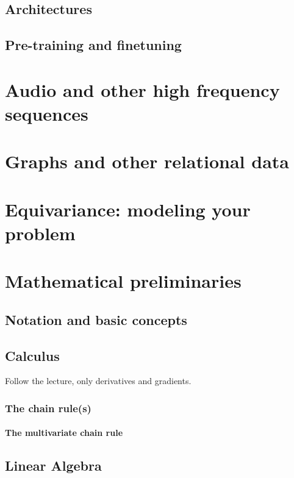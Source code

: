 \documentclass{pca}
\theoremstyle{theorem}
\theoremstyle{definition}
\theoremstyle{proof}
\begin{document}
\section{Architectures}

\section{Pre-training and finetuning}

\chapter{Audio and other high frequency sequences}


\chapter{Graphs and other relational data}

\chapter{Equivariance: modeling your problem}

\appendix

\chapter{Mathematical preliminaries}
\label{ch:preliminaries}

\section{Notation and basic concepts}

\section{Calculus}

Follow the lecture, only derivatives and gradients.

\subsection{The chain rule(s)}
\subsubsection{The multivariate chain rule}

\section{Linear Algebra}
\end{document}
